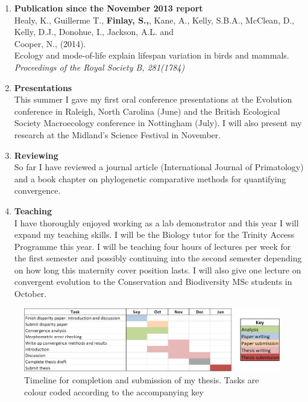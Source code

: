 \documentclass[12pt,a4paper]{article}
\begin{document}
	\begin{enumerate}

	\item \textbf{Publication since the November 2013 report}\\
		Healy, K., Guillerme T., \textbf{Finlay, S.,}, Kane, A., Kelly, S.B.A., McClean, D., Kelly, D.J., Donohue, I., Jackson, A.L. and \\Cooper, N., (2014).\\
		Ecology and mode-of-life explain lifespan variation in birds and mammals. \textit{Proceedings of the Royal Society B, 281(1784)} 

	\item \textbf{Presentations}\\
		This summer I gave my first oral conference presentations at the Evolution conference in Raleigh, North Carolina (June) and the British Ecological Society Macroecology conference in Nottingham (July). I will also present my research at the Midland's Science Festival in November. 

	\item \textbf{Reviewing}\\
		So far I have reviewed a journal article (International Journal of Primatology) and a book chapter on phylogenetic comparative methods for quantifying convergence.
		
	\item \textbf{Teaching}\\	
		I have thoroughly enjoyed working as a lab demonstrator and this year I will expand my teaching skills. I will be the Biology tutor for the Trinity Access Programme this year. I will be teaching four hours of lectures per week for the first semester and possibly continuing into the second semester depending on how long this maternity cover position lasts. I will also give one lecture on convergent evolution to the Conservation and Biodiversity MSc students in October.

	\end{enumerate}

\begin{landscape}
  \begin{figure}[p]
	\centering
	\includegraphics[keepaspectratio=true]{Gannt_July.png}
	\caption{Timeline for completion and submission of my thesis. Tasks are colour coded according to the accompanying key}
	\label{gantt}
  \end{figure}
\end{landscape}



 
\end{document}
